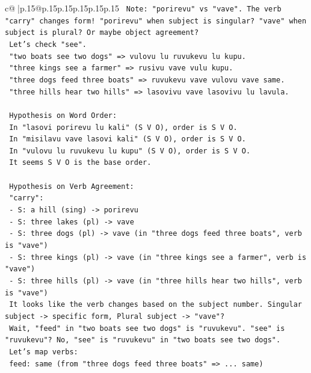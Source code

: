 \documentclass{article}
\begin{document}
{\begin{supertabular}{c@{$\;$}|p{.15\linewidth}@{}p{.15\linewidth}p{.15\linewidth}p{.15\linewidth}p{.15\linewidth}p{.15\linewidth}}
{{{\texttt{   Note: "porirevu" vs "vave". The verb "carry" changes form! "porirevu" when subject is singular? "vave" when subject is plural? Or maybe object agreement?} \\
\texttt{   Let's check "see".} \\
\texttt{   "two boats see two dogs" => vulovu lu ruvukevu lu kupu.} \\
\texttt{   "three kings see a farmer" => rusivu vave vulu kupu.} \\
\texttt{   "three dogs feed three boats" => ruvukevu vave vulovu vave same.} \\
\texttt{   "three hills hear two hills" => lasovivu vave lasovivu lu lavula.} \\
\\ 
\texttt{   Hypothesis on Word Order:} \\
\texttt{   In "lasovi porirevu lu kali" (S V O), order is S V O.} \\
\texttt{   In "misilavu vave lasovi kali" (S V O), order is S V O.} \\
\texttt{   In "vulovu lu ruvukevu lu kupu" (S V O), order is S V O.} \\
\texttt{   It seems S V O is the base order.} \\
\\ 
\texttt{   Hypothesis on Verb Agreement:} \\
\texttt{   "carry":} \\
\texttt{   {-} S: a hill (sing) {-}> porirevu} \\
\texttt{   {-} S: three lakes (pl) {-}> vave} \\
\texttt{   {-} S: three dogs (pl) {-}> vave (in "three dogs feed three boats", verb is "vave")} \\
\texttt{   {-} S: three kings (pl) {-}> vave (in "three kings see a farmer", verb is "vave")} \\
\texttt{   {-} S: three hills (pl) {-}> vave (in "three hills hear two hills", verb is "vave")} \\
\texttt{   It looks like the verb changes based on the subject number. Singular subject {-}> specific form, Plural subject {-}> "vave"?} \\
\texttt{   Wait, "feed" in "two boats see two dogs" is "ruvukevu". "see" is "ruvukevu"? No, "see" is "ruvukevu" in "two boats see two dogs".} \\
\texttt{   Let's map verbs:} \\
\texttt{   feed: same (from "three dogs feed three boats" => ... same)} \\
}}}
\end{supertabular}}
\end{document}
